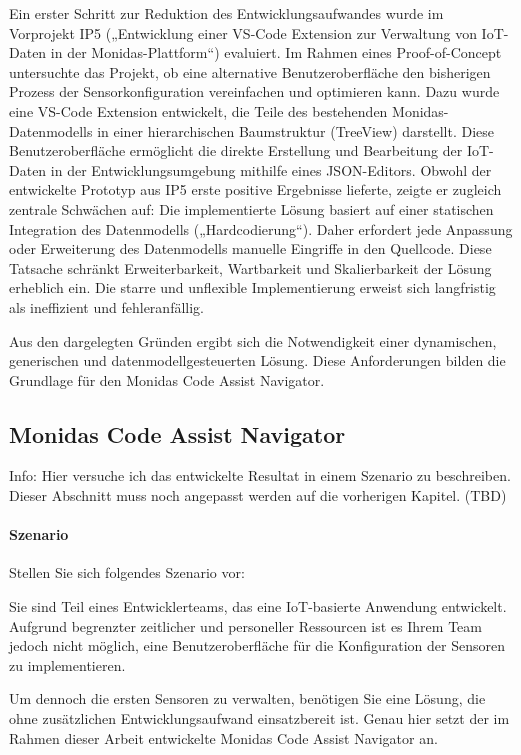 Ein erster Schritt zur Reduktion des Entwicklungsaufwandes wurde im Vorprojekt IP5 („Entwicklung einer VS-Code Extension zur Verwaltung von IoT-Daten in der Monidas-Plattform“) evaluiert. Im Rahmen eines Proof-of-Concept untersuchte das Projekt, ob eine alternative Benutzeroberfläche den bisherigen Prozess der Sensorkonfiguration vereinfachen und optimieren kann. Dazu wurde eine VS-Code Extension entwickelt, die Teile des bestehenden Monidas-Datenmodells in einer hierarchischen Baumstruktur (TreeView) darstellt. Diese Benutzeroberfläche ermöglicht die direkte Erstellung und Bearbeitung der IoT-Daten in der Entwicklungsumgebung mithilfe eines JSON-Editors. Obwohl der entwickelte Prototyp aus IP5 erste positive Ergebnisse lieferte, zeigte er zugleich zentrale Schwächen auf: Die implementierte Lösung basiert auf einer statischen Integration des Datenmodells („Hardcodierung“). Daher erfordert jede Anpassung oder Erweiterung des Datenmodells manuelle Eingriffe in den Quellcode. Diese Tatsache schränkt Erweiterbarkeit, Wartbarkeit und Skalierbarkeit der Lösung erheblich ein. Die starre und unflexible Implementierung erweist sich langfristig als ineffizient und fehleranfällig.

Aus den dargelegten Gründen ergibt sich die Notwendigkeit einer dynamischen, generischen und datenmodellgesteuerten Lösung. Diese Anforderungen bilden die Grundlage für den Monidas Code Assist Navigator.

\newpage
\subsection{Monidas Code Assist Navigator} 

Info: Hier versuche ich das entwickelte Resultat in einem Szenario zu beschreiben. Dieser Abschnitt muss noch angepasst werden auf die vorherigen Kapitel. (TBD)

\paragraph{Szenario}
Stellen Sie sich folgendes Szenario vor: 

Sie sind Teil eines Entwicklerteams, das eine IoT-basierte Anwendung entwickelt. Aufgrund begrenzter zeitlicher und personeller Ressourcen ist es Ihrem Team jedoch nicht möglich, eine Benutzeroberfläche für die Konfiguration der Sensoren zu implementieren.

Um dennoch die ersten Sensoren zu verwalten, benötigen Sie eine Lösung, die ohne zusätzlichen Entwicklungsaufwand einsatzbereit ist. Genau hier setzt der im Rahmen dieser Arbeit entwickelte Monidas Code Assist Navigator an.

